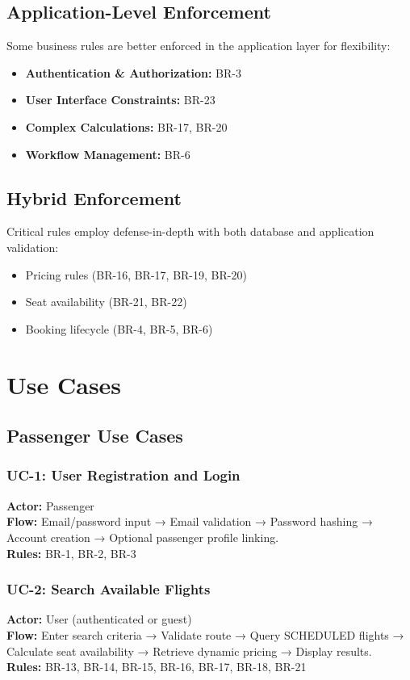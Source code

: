 \documentclass[12pt,a4paper,openany]{report}
\begin{document}
\subsection{Application-Level Enforcement}
Some business rules are better enforced in the application layer for flexibility:
\begin{itemize}
    \item \textbf{Authentication \& Authorization:} BR-3
    \item \textbf{User Interface Constraints:} BR-23
    \item \textbf{Complex Calculations:} BR-17, BR-20
    \item \textbf{Workflow Management:} BR-6
\end{itemize}

\subsection{Hybrid Enforcement}
Critical rules employ defense-in-depth with both database and application validation:
\begin{itemize}
    \item Pricing rules (BR-16, BR-17, BR-19, BR-20)
    \item Seat availability (BR-21, BR-22)
    \item Booking lifecycle (BR-4, BR-5, BR-6)
\end{itemize}

\section{Use Cases}

\subsection{Passenger Use Cases}

\subsubsection*{UC-1: User Registration and Login}
\textbf{Actor:} Passenger\\
\textbf{Flow:} Email/password input → Email validation → Password hashing → Account creation → Optional passenger profile linking.\\
\textbf{Rules:} BR-1, BR-2, BR-3

\subsubsection*{UC-2: Search Available Flights}
\textbf{Actor:} User (authenticated or guest)\\
\textbf{Flow:} Enter search criteria → Validate route → Query SCHEDULED flights → Calculate seat availability → Retrieve dynamic pricing → Display results.\\
\textbf{Rules:} BR-13, BR-14, BR-15, BR-16, BR-17, BR-18, BR-21
\end{document}
